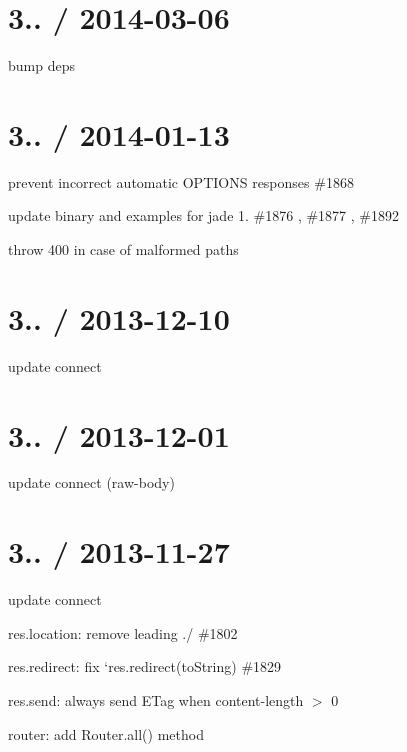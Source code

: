 \section*{3.. / 2014-\/03-\/06 }


\begin{DoxyItemize}
\item bump deps
\end{DoxyItemize}

\section*{3.. / 2014-\/01-\/13 }


\begin{DoxyItemize}
\item prevent incorrect automatic O\+P\+T\+I\+O\+N\+S responses \#1868 
\item update binary and examples for jade 1. \#1876 , \#1877 , \#1892 
\item throw 400 in case of malformed paths 
\end{DoxyItemize}

\section*{3.. / 2013-\/12-\/10 }


\begin{DoxyItemize}
\item update connect
\end{DoxyItemize}

\section*{3.. / 2013-\/12-\/01 }


\begin{DoxyItemize}
\item update connect (raw-\/body)
\end{DoxyItemize}

\section*{3.. / 2013-\/11-\/27 }


\begin{DoxyItemize}
\item update connect
\item res.\+location\+: remove leading ./ \#1802 
\item res.\+redirect\+: fix `res.redirect(\textquotesingle{}to\+String\textquotesingle{}) \#1829 
\item res.\+send\+: always send E\+Tag when content-\/length $>$ 0
\item router\+: add Router.\+all() method
\end{DoxyItemize}

